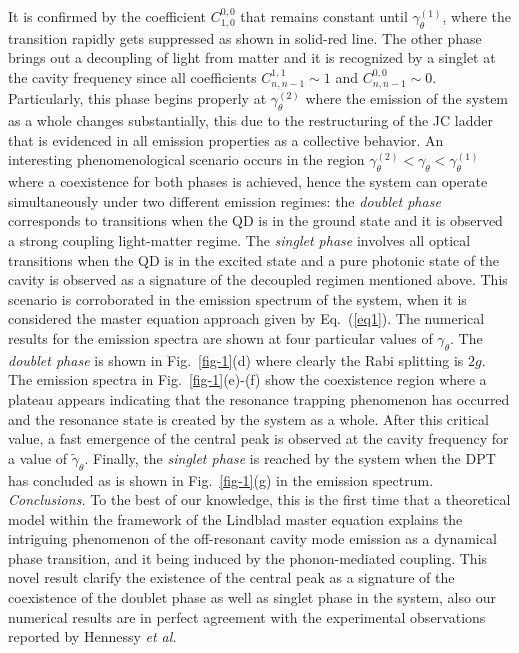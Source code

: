 \documentclass[aps,prl,showpacs,twocolumn]{revtex4}
\begin{document}
It is confirmed by the coefficient $C^{0,0}_{1,0}$ that remains constant until $\gamma_{\theta}^{(1)}$, where the transition rapidly gets suppressed as shown in solid-red line. The other phase brings out a decoupling of light from matter and it is recognized by a singlet at the cavity frequency since all coefficients $C^{1,1}_{n,n-1}\sim1$ and $C^{0,0}_{n,n-1}\sim0$. Particularly, this phase begins properly at $\gamma_{\theta}^{(2)}$ where the emission of the system as a whole changes substantially, this due to the restructuring of the JC ladder that is evidenced in all emission properties as a collective behavior. An interesting phenomenological scenario occurs in the region $\gamma_{\theta}^{(2)}<\gamma_{\theta}<\gamma_{\theta}^{(1)}$ where a coexistence for both phases is achieved, hence the system can operate simultaneously under two different emission regimes: the {\it doublet phase} corresponds to transitions when the QD is in the ground state and it is observed a strong coupling light-matter regime. The {\it singlet phase} involves all optical transitions when the QD is in the excited state and a pure photonic state of the cavity is observed as a signature of the decoupled regimen mentioned above. This scenario is corroborated in the emission spectrum of the system, when it is considered the master equation approach given by Eq.~(\ref{eq1}). The numerical results for the emission spectra are shown at four particular values of $\gamma_{\theta}$. The {\it doublet phase} is shown in Fig.~\ref{fig-1}(d) where clearly the Rabi splitting is  $2g$. The emission spectra in Fig.~\ref{fig-1}(e)-(f) show the coexistence region where a plateau appears indicating that the resonance trapping phenomenon has occurred and the resonance state is created by the system as a whole. After this critical value, a fast emergence of the central peak is observed at the cavity frequency for a value of $\tilde{\gamma}_{\theta}$. Finally, the {\it singlet phase} is reached by the system when the DPT has concluded as is shown in Fig.~\ref{fig-1}(g) in the emission spectrum.     
\\
\textit{Conclusions.}\textendash
To the best of our knowledge, this is the first time that a theoretical model within the framework of the Lindblad  master equation explains the intriguing phenomenon of the off-resonant cavity mode emission as a dynamical phase transition, and it being induced by the phonon-mediated coupling. This novel result clarify the existence of the central peak as a signature of the coexistence of the  doublet phase as well as singlet phase in the system, also our numerical results are in perfect agreement with the experimental observations reported by Hennessy {\it et al.} \\
\end{document}
